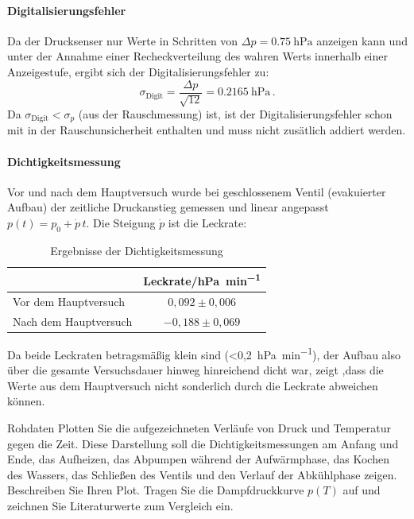 \documentclass[twoside]{protokoll}
\begin{document}
\paragraph{Digitalisierungsfehler}
Da der Drucksenser nur Werte in Schritten von $\Delta p = \SI{0.75}{\hecto\pascal}$ anzeigen kann und unter der Annahme einer Recheckverteilung des wahren Werts innerhalb einer Anzeigestufe, ergibt sich der Digitalisierungsfehler zu:
\begin{equation}
    \sigma_{\text{Digit}} = \frac{\Delta p}{\sqrt{12}} = \SI{0.2165}{\hecto\pascal} \,.
    \label{eq:digit}
\end{equation}
Da $\sigma_{\text{Digit}} < \sigma_p$ (aus der Rauschmessung) ist, ist der Digitalisierungsfehler schon mit in der Rauschunsicherheit enthalten und muss nicht zusätlich addiert werden.
\paragraph{Dichtigkeitsmessung}
Vor und nach dem Hauptversuch wurde bei geschlossenem Ventil (evakuierter Aufbau) der zeitliche Druckanstieg gemessen und linear angepasst $p(t) = p_0 + \dot{p}\, t$. Die Steigung $\dot p$ ist die Leckrate:
\begin{table}[htb]
    \centering
    \begin{tabular}{lc}
         \toprule
         & Leckrate/\si{\hecto\pascal\per\minute}\\
         \midrule
         Vor dem Hauptversuch &  $0,092 \pm 0,006$\\
         Nach dem Hauptversuch & $-0,188 \pm 0,069$\\
         \bottomrule
    \end{tabular}
    \caption{Ergebnisse der Dichtigkeitsmessung}
    \label{tab:dichtigkeit}
\end{table}

Da beide Leckraten betragsmäßig klein sind (\SI{<0,2}{\hecto\pascal\per\minute}), der Aufbau also über die gesamte Versuchsdauer hinweg hinreichend dicht war, zeigt ,dass die Werte aus dem Hauptversuch nicht sonderlich durch die Leckrate abweichen können.

\begin{aufgabe}{Rohdaten}
  Plotten Sie die aufgezeichneten Verläufe von Druck und Temperatur
  gegen die Zeit. Diese Darstellung soll die Dichtigkeitsmessungen am
  Anfang und Ende, das Aufheizen, das Abpumpen während der
  Aufwärmphase, das Kochen des Wassers, das Schließen des Ventils und
  den Verlauf der Abkühlphase zeigen. Beschreiben Sie Ihren
  Plot. Tragen Sie die Dampfdruckkurve $p(T)$ auf und zeichnen Sie
  Literaturwerte zum Vergleich ein.
\end{aufgabe}
\end{document}
